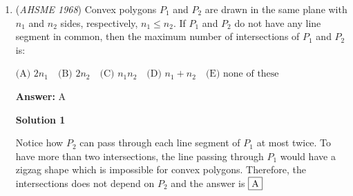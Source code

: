 \begin{enumerate}
Seeing that we need to compare values with exponents, we think \href{https://artofproblemsolving.com/wiki/index.php?title=Logarithms}{logarithms}. Taking the logarithm base $x$ of each term, we obtain $1$, $x$, and $x^x$. Because $0<x<1$, $f(n)=\log_x(n)$ is \href{https://artofproblemsolving.com/wiki/index.php?title=Monotonic}{monotonically decreasing}, so the order of terms by magnitude in our new set of numbers will be reversed compared to the original set (i.e. if $a<b<c$, then $\log_x(a)>\log_x(b)>\log_x(c))$. However, the order of this set will be reversed again (back to the order of the original set) when we take the logarithm base $x$ a second time. After doing this operation, we find the values $0$, $1$, and $x$, which correspond to $x$, $y$, and $z$, respectively. Because $0.9<x<1$, $0<x<1$, and so, by the correspondence detailed above, $x<z<y$, which yields us answer choice $\fbox{A}$.

 


 



\textbf{Solution 2}

Because $0<x<1$, taking $x$ to the $x$th power will bring it closer to $1$, thereby raising its value. Because we have established that $x<x^x$, and $f(n)=x^n$ is a \href{https://artofproblemsolving.com/wiki/index.php?title=Monotonic}{monotonically decreasing} function, we know that $x^x>x^{x^x}$. However, because $x^x<1$, $x^{x^x}$, compared to $x$, will be closer to (but still less than) $1$. Thus, $x^{x^x}>x$. Putting this all together, we see that $x<x^{x^x}<x^x$, or $x<z<y$, which is answer choice $\fbox{A}$.

 


 


	\item (\textit{AHSME 1968}) Convex polygons $P_1$ and $P_2$ are drawn in the same plane with $n_1$ and $n_2$ sides, respectively, $n_1\le n_2$. If $P_1$ and $P_2$ do not have any line segment in common, then the maximum number of intersections of $P_1$ and $P_2$ is:


 $\text{(A) } 2n_1\quad \text{(B) } 2n_2\quad \text{(C) } n_1n_2\quad \text{(D) } n_1+n_2\quad \text{(E) } \text{none of these}$

 \textbf{Answer: }A



\textbf{Solution 1}

Notice how $P_2$ can pass through each line segment of $P_1$ at most twice. To have more than two intersections, the line passing through $P_1$ would have a zigzag shape which is impossible for convex polygons. Therefore, the intersections does not depend on $P_2$ and the answer is $\fbox{A}$





\end{enumerate}
